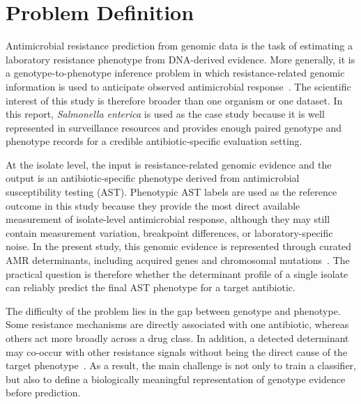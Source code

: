 \section{Problem Definition}

Antimicrobial resistance prediction from genomic data is the task of estimating a laboratory resistance phenotype from DNA-derived evidence. More generally, it is a genotype-to-phenotype inference problem in which resistance-related genomic information is used to anticipate observed antimicrobial response~\citep{shen2024comparison,ren2022prediction}. The scientific interest of this study is therefore broader than one organism or one dataset. In this report, \textit{Salmonella enterica} is used as the case study because it is well represented in surveillance resources and provides enough paired genotype and phenotype records for a credible antibiotic-specific evaluation setting.

At the isolate level, the input is resistance-related genomic evidence and the output is an antibiotic-specific phenotype derived from antimicrobial susceptibility testing (AST). Phenotypic AST labels are used as the reference outcome in this study because they provide the most direct available measurement of isolate-level antimicrobial response, although they may still contain measurement variation, breakpoint differences, or laboratory-specific noise.
In the present study, this genomic evidence is represented through curated AMR determinants, including acquired genes and chromosomal mutations~\citep{feldgarden2021amrfinderplus,munita2016mechanisms}.
The practical question is therefore whether the determinant profile of a single isolate can reliably predict the final AST phenotype for a target antibiotic.


The difficulty of the problem lies in the gap between genotype and phenotype. Some resistance mechanisms are directly associated with one antibiotic, whereas others act more broadly across a drug class. In addition, a detected determinant may co-occur with other resistance signals without being the direct cause of the target phenotype~\citep{shen2024comparison,munita2016mechanisms}. As a result, the main challenge is not only to train a classifier, but also to define a biologically meaningful representation of genotype evidence before prediction.

